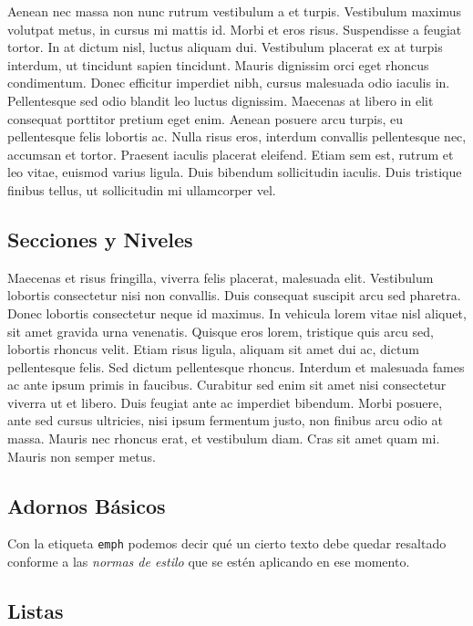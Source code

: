 Aenean nec massa non nunc rutrum vestibulum a et turpis. Vestibulum maximus volutpat metus, in cursus mi mattis id. Morbi et eros risus. Suspendisse a feugiat tortor. In at dictum nisl, luctus aliquam dui. Vestibulum placerat ex at turpis interdum, ut tincidunt sapien tincidunt. Mauris dignissim orci eget rhoncus condimentum. Donec efficitur imperdiet nibh, cursus malesuada odio iaculis in. Pellentesque sed odio blandit leo luctus dignissim. Maecenas at libero in elit consequat porttitor pretium eget enim. Aenean posuere arcu turpis, eu pellentesque felis lobortis ac. Nulla risus eros, interdum convallis pellentesque nec, accumsan et tortor. Praesent iaculis placerat eleifend. Etiam sem est, rutrum et leo vitae, euismod varius ligula. Duis bibendum sollicitudin iaculis. Duis tristique finibus tellus, ut sollicitudin mi ullamcorper vel.

\subsection{Secciones y Niveles}
\label{subsec:secciones}

Maecenas et risus fringilla, viverra felis placerat, malesuada elit. Vestibulum lobortis consectetur nisi non convallis. Duis consequat suscipit arcu sed pharetra. Donec lobortis consectetur neque id maximus. In vehicula lorem vitae nisl aliquet, sit amet gravida urna venenatis. Quisque eros lorem, tristique quis arcu sed, lobortis rhoncus velit. Etiam risus ligula, aliquam sit amet dui ac, dictum pellentesque felis. Sed dictum pellentesque rhoncus. Interdum et malesuada fames ac ante ipsum primis in faucibus. Curabitur sed enim sit amet nisi consectetur viverra ut et libero. Duis feugiat ante ac imperdiet bibendum. Morbi posuere, ante sed cursus ultricies, nisi ipsum fermentum justo, non finibus arcu odio at massa. Mauris nec rhoncus erat, et vestibulum diam. Cras sit amet quam mi. Mauris non semper metus.

\subsection{Adornos Básicos}

Con la etiqueta \texttt{emph} podemos decir qué un cierto texto debe quedar resaltado conforme a las \emph{normas de estilo} que se estén aplicando en ese momento.

\subsection{Listas}

